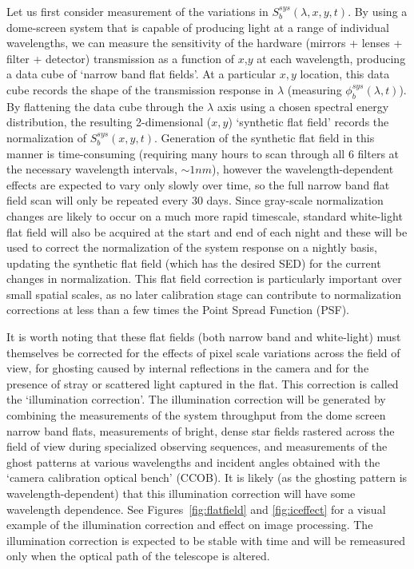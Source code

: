 \documentclass[12pt,preprint]{aastex}
\begin{document}
Let us first consider measurement of the variations in
$S_b^{sys}(\lambda,x,y,t)$.  By using a dome-screen system that is
capable of producing light at a range of individual wavelengths, we
can measure the sensitivity of the hardware (mirrors + lenses + filter
+ detector) transmission as a function of $x$,$y$ at each wavelength,
producing a data cube of `narrow band flat fields'. At a particular
$x,y$ location, this data cube records the shape of the transmission
response in $\lambda$ (measuring $\phi_b^{sys}(\lambda,t)$). By
flattening the data cube through the $\lambda$ axis using a chosen
spectral energy distribution, the resulting 2-dimensional ($x,y$)
`synthetic flat field' records the normalization of
$S_b^{sys}(x,y,t)$. Generation of the synthetic flat field in this
manner is time-consuming (requiring many hours to scan through all 6
filters at the necessary wavelength intervals, $\sim1nm$), however the
wavelength-dependent effects are expected to vary only slowly over
time, so the full narrow band flat field scan will only be repeated
every 30 days. Since gray-scale normalization changes are likely to
occur on a much more rapid timescale, standard white-light flat field
will also be acquired at the start and end of each night and these
will be used to correct the normalization of the system response on a
nightly basis, updating the synthetic flat field (which has the
desired SED) for the current changes in normalization. This flat field
correction is particularly important over small spatial scales, as no
later calibration stage can contribute to normalization corrections at
less than a few times the Point Spread Function (PSF).

It is worth noting that these flat fields (both narrow band and
white-light) must themselves be corrected for the effects of pixel
scale variations across the field of view, for ghosting caused by
internal reflections in the camera and for the presence of stray or
scattered light captured in the flat. This correction is called the
`illumination correction'. The illumination correction will be
generated by combining the measurements of the system throughput from
the dome screen narrow band flats, measurements of bright, dense star
fields rastered across the field of view during specialized observing
sequences, and measurements of the ghost patterns at various
wavelengths and incident angles obtained with the `camera calibration
optical bench' (CCOB).  It is likely (as the ghosting pattern is
wavelength-dependent) that this illumination correction will have some
wavelength dependence. See Figures~\ref{fig:flatfield} and
\ref{fig:iceffect} for a visual example of the illumination correction
and effect on image processing. The illumination correction is expected 
to be stable with time and will be remeasured only when the optical path
of the telescope is altered. 
\end{document}
